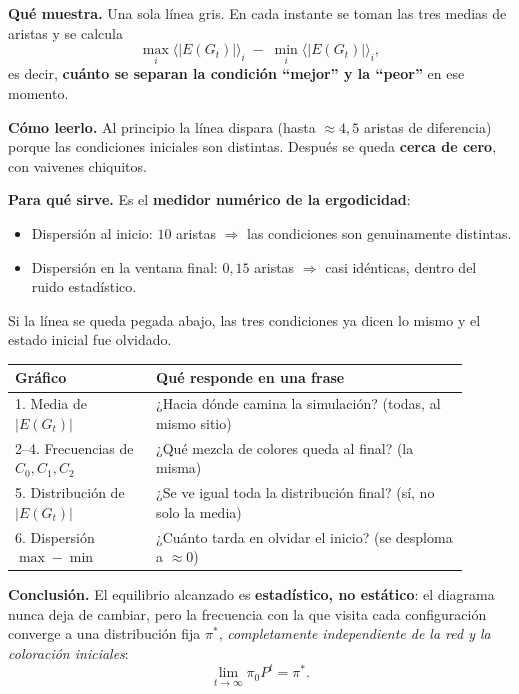 \documentclass[11pt,a4paper]{article}
\newcommand{\E}{|E(G_t)|}
\begin{document}
\begin{tcolorbox}[myblock,title=6. Dispersión entre condiciones (\(\max-\min\) de \(\langle\E\rangle\)) --- \textit{``el cronómetro del olvido''}]
\textbf{Qué muestra.} Una sola línea gris. En cada instante se toman las tres
medias de aristas y se calcula
\[
\max_{i}\langle\E\rangle_i \;-\; \min_{i}\langle\E\rangle_i,
\]
es decir, \textbf{cuánto se separan la condición ``mejor'' y la ``peor''} en ese
momento.

\textbf{Cómo leerlo.} Al principio la línea dispara (hasta \(\approx4{,}5\)
aristas de diferencia) porque las condiciones iniciales son distintas. Después
se queda \textbf{cerca de cero}, con vaivenes chiquitos.

\textbf{Para qué sirve.} Es el \textbf{medidor numérico de la ergodicidad}:
\begin{itemize}[nosep]
  \item Dispersión al inicio: \(10\) aristas \(\Rightarrow\) las condiciones son
        genuinamente distintas.
  \item Dispersión en la ventana final: \(0{,}15\) aristas \(\Rightarrow\) casi
        idénticas, dentro del ruido estadístico.
\end{itemize}
Si la línea se queda pegada abajo, las tres condiciones ya dicen lo mismo y el
estado inicial fue olvidado.
\end{tcolorbox}

\begin{tcolorbox}[myblock,title=Los seis gráficos dicen lo mismo, desde ángulos distintos]
\begin{center}
\begin{tabular}{p{0.28\linewidth}p{0.62\linewidth}}
\toprule
\textbf{Gráfico} & \textbf{Qué responde en una frase} \\
\midrule
1. Media de \(\E\) & ¿Hacia dónde camina la simulación? (todas, al mismo sitio) \\
2--4. Frecuencias de \(C_0,C_1,C_2\) & ¿Qué mezcla de colores queda al final? (la misma) \\
5. Distribución de \(\E\) & ¿Se ve igual toda la distribución final? (sí, no solo la media) \\
6. Dispersión \(\max-\min\) & ¿Cuánto tarda en olvidar el inicio? (se desploma a \(\approx0\)) \\
\bottomrule
\end{tabular}
\end{center}

\medskip
\textbf{Conclusión.} El equilibrio alcanzado es \textbf{estadístico, no
estático}: el diagrama nunca deja de cambiar, pero la frecuencia con la que
visita cada configuración converge a una distribución fija \(\pi^*\),
\emph{completamente independiente de la red y la coloración iniciales}:
\[
\lim_{t\to\infty}\pi_0 P^{t}=\pi^{*}.
\]
\end{tcolorbox}
\end{document}
